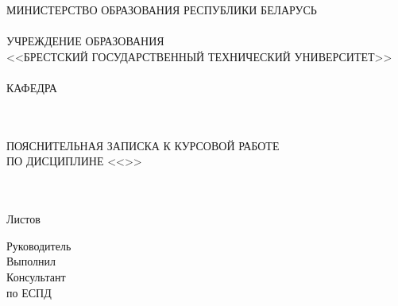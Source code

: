 \begin{center}
    МИНИСТЕРСТВО ОБРАЗОВАНИЯ РЕСПУБЛИКИ БЕЛАРУСЬ\\
    \hspace{0pt}\\
    УЧРЕЖДЕНИЕ ОБРАЗОВАНИЯ\\
    <<БРЕСТСКИЙ ГОСУДАРСТВЕННЫЙ ТЕХНИЧЕСКИЙ УНИВЕРСИТЕТ>>\\
    \hspace{0pt}\\
    КАФЕДРА \titlePageKafedra\\
\end{center}

\vfill

\begin{center}
    \titlePageTopic\\
    \hspace{0pt}\\
    ПОЯСНИТЕЛЬНАЯ ЗАПИСКА К КУРСОВОЙ РАБОТЕ\\
    ПО ДИСЦИПЛИНЕ <<\titlePageDistiplina>>
\end{center}

\vfill

\begin{center}
    \codePZ\\
    \hspace{0pt}\\
    Листов \pageref{LastPage}
\end{center}

\vfill

\begin{flushright}
    \begin{minipage}[t]{.49\textwidth}
        \begin{minipage}[t]{.75\textwidth}
            \begin{flushright}
                Руководитель\\
                Выполнил\\
                Консультант\\
                по ЕСПД
            \end{flushright}
        \end{minipage}
    \end{minipage}
    \begin{minipage}[t]{.49\textwidth}
        \begin{flushright}
            \begin{minipage}[t]{.75\textwidth}
                \titlePageLeaderName~\titlePageLeaderSurname\\
                \titlePageAuthorName~\titlePageAuthorSurname\\
                \hspace{0pt}\\
                \titlePageConsultantName~\titlePageConsultantSurname\\
            \end{minipage}
        \end{flushright}
        
    \end{minipage}
\end{flushright}

\vfill

\begin{center}
    \ESKDtheYear\\
\end{center}